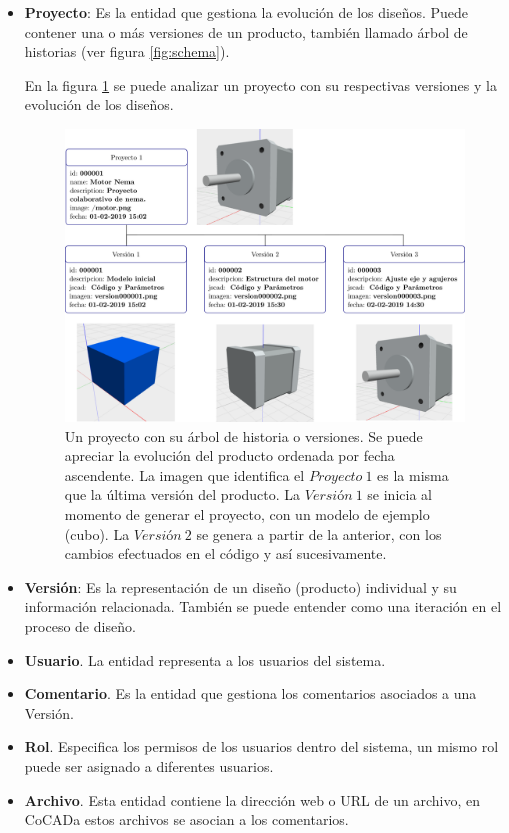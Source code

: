 \begin{itemize}
    \item \textbf{Proyecto}: Es la entidad que gestiona la  evolución de los diseños. Puede contener una o más versiones de un producto, también llamado árbol de historias (ver figura \ref{fig:schema}). 
    
    En la figura \ref{fig:schema2} se puede analizar un  proyecto con su respectivas versiones y la evolución de los diseños.
    \begin{figure}[h]
    \includegraphics[width=16cm]{Img/Desarrollo/cocada-de.png}
    \centering
    \caption{\footnotesize{Un proyecto con su árbol de historia o versiones. Se puede apreciar la evolución del producto ordenada por fecha ascendente. La imagen que identifica el $Proyecto \ 1$ es la misma que la última versión del producto. La $Versión \ 1$ se inicia al momento de generar el proyecto, con un modelo de ejemplo (cubo). La $Versión \ 2$ se genera a partir de la anterior, con los cambios efectuados en el código y así sucesivamente.}}
    \label{fig:schema2}
    \end{figure}
    
    \item \textbf{Versión}: Es la representación de un diseño (producto) individual y su información relacionada. También se puede entender como una iteración en el proceso de diseño. 
    
    
    \item \textbf{Usuario}. La entidad representa a los usuarios del sistema. 
    
    \item \textbf{Comentario}. 
    Es la entidad que gestiona los comentarios asociados a una Versión.
    
    \item \textbf{Rol}. Especifica los permisos de los usuarios dentro del sistema, un mismo rol puede ser asignado a diferentes usuarios.
    
    \item \textbf{Archivo}. Esta entidad contiene la dirección web o URL de un archivo, en CoCADa estos archivos se asocian a los comentarios.
    
\end{itemize}

